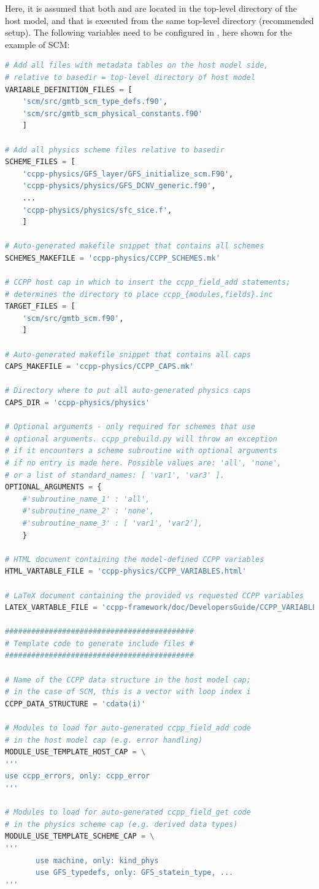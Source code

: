 Here, it is assumed that both  and  are located in the top-level directory of the host model, and that  is executed from the same top-level directory (recommended setup). The following variables need to be configured in , here shown for the example of SCM:
\begin{lstlisting}[language=python]
# Add all files with metadata tables on the host model side,
# relative to basedir = top-level directory of host model
VARIABLE_DEFINITION_FILES = [
    'scm/src/gmtb_scm_type_defs.f90',
    'scm/src/gmtb_scm_physical_constants.f90'
    ]

# Add all physics scheme files relative to basedir
SCHEME_FILES = [
    'ccpp-physics/GFS_layer/GFS_initialize_scm.F90',
    'ccpp-physics/physics/GFS_DCNV_generic.f90',
    ...
    'ccpp-physics/physics/sfc_sice.f',
    ]

# Auto-generated makefile snippet that contains all schemes
SCHEMES_MAKEFILE = 'ccpp-physics/CCPP_SCHEMES.mk'

# CCPP host cap in which to insert the ccpp_field_add statements;
# determines the directory to place ccpp_{modules,fields}.inc
TARGET_FILES = [
    'scm/src/gmtb_scm.f90',
    ]

# Auto-generated makefile snippet that contains all caps
CAPS_MAKEFILE = 'ccpp-physics/CCPP_CAPS.mk'

# Directory where to put all auto-generated physics caps
CAPS_DIR = 'ccpp-physics/physics'

# Optional arguments - only required for schemes that use
# optional arguments. ccpp_prebuild.py will throw an exception
# if it encounters a scheme subroutine with optional arguments
# if no entry is made here. Possible values are: 'all', 'none',
# or a list of standard_names: [ 'var1', 'var3' ].
OPTIONAL_ARGUMENTS = {
    #'subroutine_name_1' : 'all',
    #'subroutine_name_2' : 'none',
    #'subroutine_name_3' : [ 'var1', 'var2'],
    }

# HTML document containing the model-defined CCPP variables
HTML_VARTABLE_FILE = 'ccpp-physics/CCPP_VARIABLES.html'

# LaTeX document containing the provided vs requested CCPP variables
LATEX_VARTABLE_FILE = 'ccpp-framework/doc/DevelopersGuide/CCPP_VARIABLES.tex'

###########################################
# Template code to generate include files #
###########################################

# Name of the CCPP data structure in the host model cap;
# in the case of SCM, this is a vector with loop index i
CCPP_DATA_STRUCTURE = 'cdata(i)'

# Modules to load for auto-generated ccpp_field_add code
# in the host model cap (e.g. error handling)
MODULE_USE_TEMPLATE_HOST_CAP = \
'''
use ccpp_errors, only: ccpp_error
'''

# Modules to load for auto-generated ccpp_field_get code
# in the physics scheme cap (e.g. derived data types)
MODULE_USE_TEMPLATE_SCHEME_CAP = \
'''
       use machine, only: kind_phys
       use GFS_typedefs, only: GFS_statein_type, ...
'''
\end{lstlisting}

